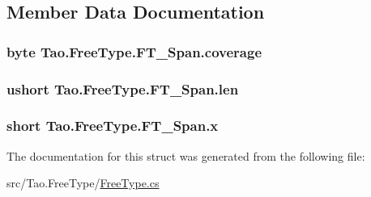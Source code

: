 \subsection{Member Data Documentation}
\hypertarget{struct_tao_1_1_free_type_1_1_f_t___span_abda38ed9c10f028765e36dbd1c6d94cb}{
\subsubsection[{coverage}]{\setlength{\rightskip}{0pt plus 5cm}byte {\bf Tao.FreeType.FT\_\-Span.coverage}}}
\label{struct_tao_1_1_free_type_1_1_f_t___span_abda38ed9c10f028765e36dbd1c6d94cb}
\hypertarget{struct_tao_1_1_free_type_1_1_f_t___span_afb3b3f463b12a452683982fae4b316ef}{
\subsubsection[{len}]{\setlength{\rightskip}{0pt plus 5cm}ushort {\bf Tao.FreeType.FT\_\-Span.len}}}
\label{struct_tao_1_1_free_type_1_1_f_t___span_afb3b3f463b12a452683982fae4b316ef}
\hypertarget{struct_tao_1_1_free_type_1_1_f_t___span_a791ebf79ab6ce3adb0dfda778e43d095}{
\subsubsection[{x}]{\setlength{\rightskip}{0pt plus 5cm}short {\bf Tao.FreeType.FT\_\-Span.x}}}
\label{struct_tao_1_1_free_type_1_1_f_t___span_a791ebf79ab6ce3adb0dfda778e43d095}


The documentation for this struct was generated from the following file:\begin{DoxyCompactItemize}
\item 
src/Tao.FreeType/\hyperlink{_free_type_8cs}{FreeType.cs}\end{DoxyCompactItemize}
